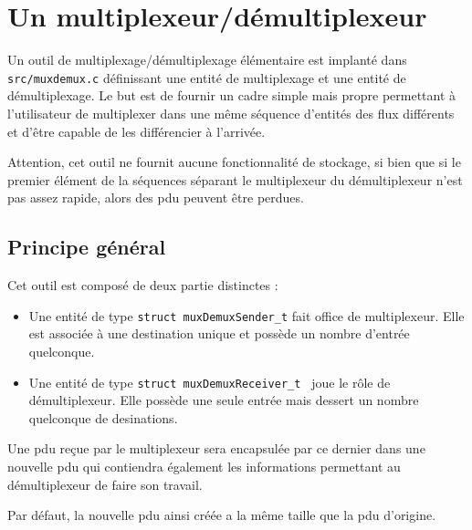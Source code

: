 %
\section{Un multiplexeur/démultiplexeur}
\label{section:muxdemux}

   Un outil de multiplexage/démultiplexage élémentaire est implanté
dans {\tt src/muxdemux.c} définissant une entité de multiplexage et
une entité de démultiplexage. Le but est de fournir un cadre simple
mais propre permettant à l'utilisateur de multiplexer dans une même
séquence d'entités des flux différents et d'\^etre capable de les
différencier à l'arrivée.

   Attention, cet outil ne fournit aucune fonctionnalité de stockage,
si bien que si le premier élément de la séquences séparant le
multiplexeur du démultiplexeur n'est pas assez rapide, alors des {\sc
  pdu} peuvent être perdues.

%
\subsection{Principe général}

   Cet outil est composé de deux partie distinctes :

\begin{itemize}
   \item Une entité de type {\tt struct muxDemuxSender\_t} fait office
     de multiplexeur. Elle est associée à une destination unique et
     possède un nombre d'entrée quelconque.
   \item Une entité de type {\tt struct muxDemuxReceiver\_t } joue le
     rôle de démultiplexeur. Elle possède une seule entrée mais
     dessert un nombre quelconque de desinations.
\end{itemize}

   Une {\sc pdu} reçue par le multiplexeur sera encapsulée par ce
dernier  dans une nouvelle {\sc pdu} qui contiendra également les
informations permettant au démultiplexeur de faire son travail.

   Par défaut, la nouvelle {\sc pdu} ainsi créée a la même taille que
la {\sc pdu} d'origine.

%
